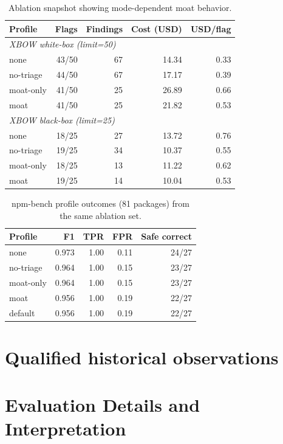 \documentclass[11pt]{article}
\begin{document}
\begin{table}[ht]
\centering
\small
\begin{tabular}{lrrrr}
\toprule
Profile & Flags & Findings & Cost (USD) & USD/flag \\
\midrule
\multicolumn{5}{l}{\textit{XBOW white-box (limit=50)}} \\
none & 43/50 & 67 & 14.34 & 0.33 \\
no-triage & 44/50 & 67 & 17.17 & 0.39 \\
moat-only & 41/50 & 25 & 26.89 & 0.66 \\
moat & 41/50 & 25 & 21.82 & 0.53 \\
\midrule
\multicolumn{5}{l}{\textit{XBOW black-box (limit=25)}} \\
none & 18/25 & 27 & 13.72 & 0.76 \\
no-triage & 19/25 & 34 & 10.37 & 0.55 \\
moat-only & 18/25 & 13 & 11.22 & 0.62 \\
moat & 19/25 & 14 & 10.04 & 0.53 \\
\bottomrule
\end{tabular}
\caption{Ablation snapshot showing mode-dependent moat behavior.}
\label{tab:ablation-xbow}
\end{table}

\begin{table}[ht]
\centering
\small
\begin{tabular}{lrrrr}
\toprule
Profile & F1 & TPR & FPR & Safe correct \\
\midrule
none & 0.973 & 1.00 & 0.11 & 24/27 \\
no-triage & 0.964 & 1.00 & 0.15 & 23/27 \\
moat-only & 0.964 & 1.00 & 0.15 & 23/27 \\
moat & 0.956 & 1.00 & 0.19 & 22/27 \\
default & 0.956 & 1.00 & 0.19 & 22/27 \\
\bottomrule
\end{tabular}
\caption{npm-bench profile outcomes (81 packages) from the same ablation set.}
\label{tab:ablation-npm}
\end{table}

\section{Qualified historical observations}


\section{Evaluation Details and Interpretation}
\end{document}
